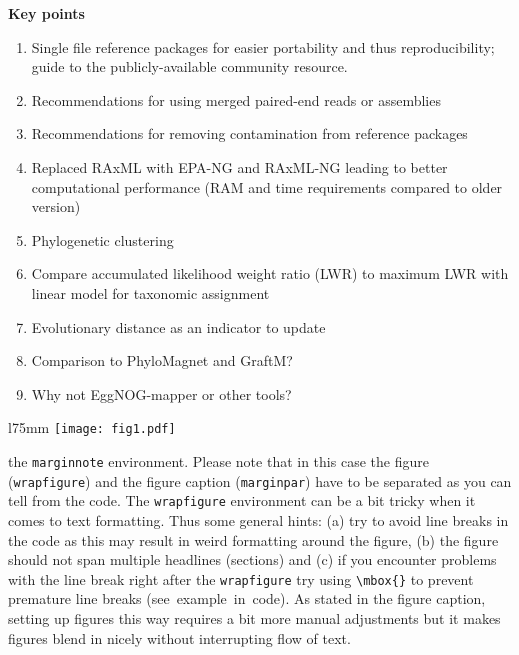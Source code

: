 \documentclass[10pt,letterpaper]{article}
\begin{document}
\textbf{Key points}
\begin{enumerate}
\item Single file reference packages for easier portability and thus reproducibility; guide to the publicly-available community resource.
\item Recommendations for using merged paired-end reads or assemblies
\item Recommendations for removing contamination from reference packages
\item Replaced RAxML with EPA-NG and RAxML-NG leading to better computational performance (RAM and time requirements compared to older version)
\item Phylogenetic clustering
\item Compare accumulated likelihood weight ratio (LWR) to maximum LWR with linear model for taxonomic assignment
\item Evolutionary distance as an indicator to update
\item Comparison to PhyloMagnet and GraftM?
\item Why not EggNOG-mapper or other tools?
\end{enumerate}



\begin{wrapfigure}[19]{l}{75mm}
\texttt{[image: fig1.pdf]}
\captionsetup{labelformat=empty} %
\caption{} %
\label{fig1} %
\end{wrapfigure} %
the \verb!marginnote! environment. Please note that in this case the figure (\verb!wrapfigure!) and the figure caption (\verb!marginpar!) have to be separated as you can tell from the code. The \verb!wrapfigure! environment can be a bit tricky when it comes to text formatting. Thus some general hints: (a) try to avoid line breaks in the code as this may result in weird formatting around the figure, (b) the figure should not span multiple headlines (sections) and (c) if you encounter problems with the line break right after the \verb!wrapfigure! try using \verb!\mbox{}! to prevent premature line breaks (\mbox{see example in code}). As stated in the figure caption, setting up figures this way requires a bit more manual adjustments but it makes figures blend in nicely without interrupting flow of text.
\end{document}
